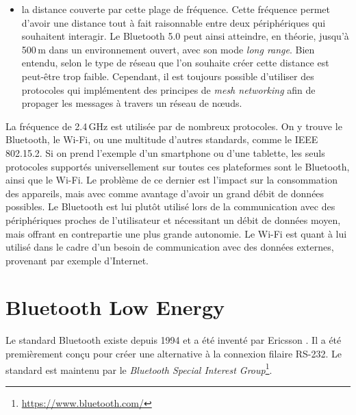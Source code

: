 \begin{itemize}
    \item la distance couverte par cette plage de fréquence. Cette fréquence permet d'avoir une distance tout à fait raisonnable entre deux périphériques qui souhaitent interagir. Le Bluetooth 5.0 peut ainsi atteindre, en théorie, jusqu'à 500\,m dans un environnement ouvert, avec son mode \textit{long range}\cite{Explorin32:online}. Bien entendu, selon le type de réseau que l'on souhaite créer cette distance est peut-être trop faible. Cependant, il est toujours possible d'utiliser des protocoles qui implémentent des principes de \textit{mesh networking} afin de propager les messages à travers un réseau de n\oe uds.\\
\end{itemize}

La fréquence de 2.4\,GHz est utilisée par de nombreux protocoles. On y trouve le Bluetooth, le Wi-Fi, ou une multitude d'autres standards, comme le IEEE 802.15.2. Si on prend l'exemple d'un smartphone ou d'une tablette, les seuls protocoles supportés universellement sur toutes ces plateformes sont le Bluetooth, ainsi que le Wi-Fi. Le problème de ce dernier est l'impact sur la consommation des appareils, mais avec comme avantage d'avoir un grand débit de données possibles. Le Bluetooth est lui plutôt utilisé lors de la communication avec des périphériques proches de l'utilisateur et nécessitant un débit de données moyen, mais offrant en contrepartie une plus grande autonomie. Le Wi-Fi est quant à lui utilisé dans le cadre d'un besoin de communication avec des données externes, provenant par exemple d'Internet.\\



\section{Bluetooth Low Energy}
\label{sec-stateoftheart_ble}

Le standard Bluetooth existe depuis 1994 et a été inventé par Ericsson \cite{Bluetoot45:online}. Il a été premièrement conçu pour créer une alternative à la connexion filaire RS-232. Le standard est maintenu par le \textit{Bluetooth Special Interest Group}\footnote{\url{https://www.bluetooth.com/}}.\\

